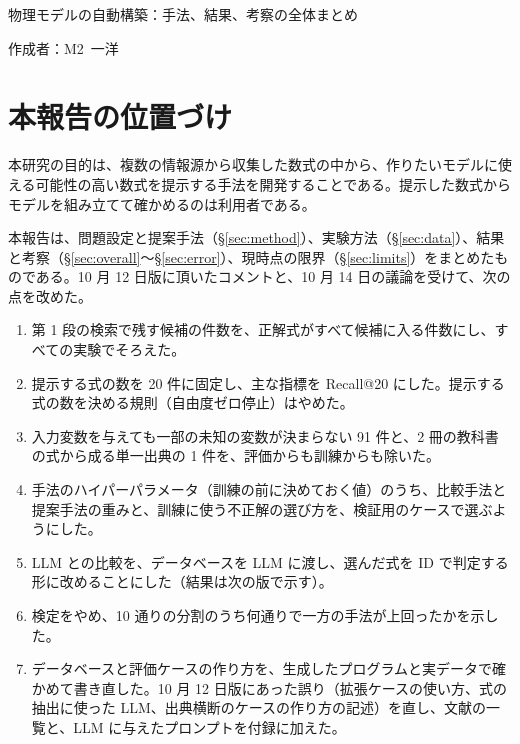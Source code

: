 \documentclass[11pt,a4paper]{ltjsarticle}
\begin{document}
\begin{center}
{\sffamily\large 物理モデルの自動構築：手法、結果、考察の全体まとめ}
\end{center}
\vspace{0.3em}
\hfill 作成者：M2\ 一洋
\vspace{0.8em}

\section{本報告の位置づけ}
本研究の目的は、複数の情報源から収集した数式の中から、作りたいモデルに使える可能性の高い数式を提示する手法を開発することである。提示した数式からモデルを組み立てて確かめるのは利用者である。

本報告は、問題設定と提案手法（\S\ref{sec:method}）、実験方法（\S\ref{sec:data}）、結果と考察（\S\ref{sec:overall}〜\S\ref{sec:error}）、現時点の限界（\S\ref{sec:limits}）をまとめたものである。10 月 12 日版に頂いたコメントと、10 月 14 日の議論を受けて、次の点を改めた。
\begin{enumerate}[label=(\arabic*), leftmargin=2.2em]
  \item 第 1 段の検索で残す候補の件数を、正解式がすべて候補に入る件数にし、すべての実験でそろえた。
  \item 提示する式の数を 20 件に固定し、主な指標を Recall@20 にした。提示する式の数を決める規則（自由度ゼロ停止）はやめた。
  \item 入力変数を与えても一部の未知の変数が決まらない 91 件と、2 冊の教科書の式から成る単一出典の 1 件を、評価からも訓練からも除いた。
  \item 手法のハイパーパラメータ（訓練の前に決めておく値）のうち、比較手法と提案手法の重みと、訓練に使う不正解の選び方を、検証用のケースで選ぶようにした。
  \item LLM との比較を、データベースを LLM に渡し、選んだ式を ID で判定する形に改めることにした（結果は次の版で示す）。
  \item 検定をやめ、10 通りの分割のうち何通りで一方の手法が上回ったかを示した。
  \item データベースと評価ケースの作り方を、生成したプログラムと実データで確かめて書き直した。10 月 12 日版にあった誤り（拡張ケースの使い方、式の抽出に使った LLM、出典横断のケースの作り方の記述）を直し、文献の一覧と、LLM に与えたプロンプトを付録に加えた。
\end{enumerate}
\end{document}
